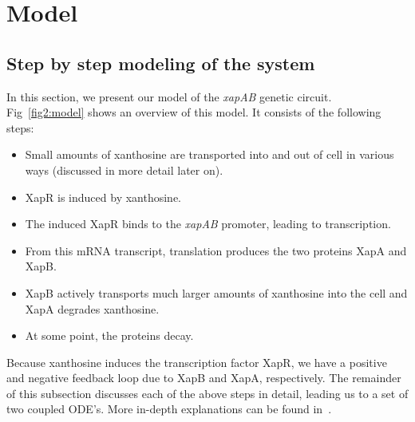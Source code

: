\documentclass[10pt,letterpaper]{article}
\begin{document}
\section*{Model}
\subsection*{Step by step modeling of the system}
In this section, we present our model of the \emph{xapAB} genetic circuit.
Fig~\ref{fig2:model} shows an overview of this model. It consists of the
following steps: 
\begin{itemize}
	\item Small amounts of xanthosine are transported into and out of cell in various ways (discussed in more detail later on).
	\item XapR is induced by xanthosine.
	\item The induced XapR binds to the \emph{xapAB} promoter, leading to transcription.
	\item From this mRNA transcript, translation produces the two proteins XapA and XapB.
	\item XapB actively transports much larger amounts of xanthosine into the cell and XapA degrades xanthosine.
	\item At some point, the proteins decay.
\end{itemize}
Because xanthosine induces the transcription factor XapR, we have a positive
and negative feedback loop due to XapB and XapA, respectively. The remainder
of this subsection discusses each of the above steps in detail, leading us
to a set of two coupled ODE's. More in-depth explanations can be found
in~.
\end{document}
